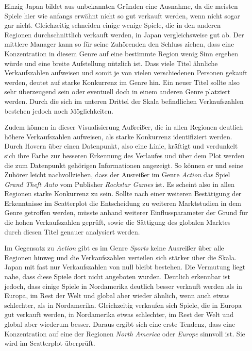 \documentclass[usegeometry=true]{scrartcl}
\begin{document}
Einzig Japan bildet aus unbekannten Gründen eine Ausnahme, da die meisten Spiele hier wie anfangs erwähnt nicht so gut verkauft werden, wenn nicht sogar gar nicht. 
Gleichzeitig schneiden einige wenige Spiele, die in den anderen Regionen durchschnittlich verkauft werden, in Japan vergleichsweise gut ab. 
Der mittlere Manager kann so für seine Zuhörenden den Schluss ziehen, dass eine Konzentration in diesem Genre auf eine bestimmte Region wenig Sinn ergeben würde und eine breite Aufstellung nützlich ist.
Dass viele Titel ähnliche Verkaufszahlen aufweisen und somit je von vielen verschiedenen Personen gekauft werden, deutet auf starke Konkurrenz im Genre hin. 
Ein neuer Titel sollte also sehr überzeugend sein oder eventuell doch in einem anderen Genre platziert werden. 
Durch die sich im unteren Drittel der Skala befindlichen Verkaufszahlen bestehen jedoch noch Möglichkeiten.

Zudem können in dieser Visualisierung Außreißer, die in allen Regionen deutlich höhere Verkaufszahlen aufweisen, als starke Konkurrenz identifiziert werden. 
Durch Hovern über einen Datenpunkt, also eine Linie, kräftigt und verdunkelt sich ihre Farbe zur besseren Erkennung des Verlaufes und über dem Plot werden die zum Datenpunkt gehörigen Informationen angezeigt.
So können er und seine Zuhörer leicht nachvollziehen, dass der Ausreißer im Genre \textit{Action} das Spiel \textit{Grand Theft Auto} vom Publisher \textit{Rockstar Games} ist.
Es scheint also in allen Regionen starke Konkurrenz zu sein. 
Sollte nach einer weiteren Bestätigung der Erkenntnisse im Scatterplot die Entscheidung zu weiteren Marktstudien in dem Genre getroffen werden, müsste anhand weiterer Einflussparameter der Grund für die hohen Verkaufszahlen geprüft, sowie die Sättigung des globalen Marktes durch diesen Titel genauer analysiert werden.

Im Gegensatz zu \textit{Action} gibt es im Genre \textit{Sports} keine Ausreißer über alle Regionen hinweg und die Verkaufszahlen verteilen sich stärker über die Skala. 
Japan mit fast nur Verkaufszahlen von null bleibt bestehen. Die Vermutung liegt nahe, dass diese Spiele dort nicht angeboten wurden.
Deutlich erkennbar ist jedoch, dass einige Spiele in Nordamerika deutlich besser verkauft werden als in Europa, im Rest der Welt und global aber wieder ähnlich, wenn auch etwas schlechter, als in Nordamerika. 
Gleichzeitig verkaufen sich Spiele, die in Europa gut verkauft werden, in Nordamerika etwas schlechter, im Rest der Welt und global aber wiederum besser. 
Daraus ergibt sich eine erste Tendenz, dass eine Konzentration auf eine der Regionen \textit{North America} oder \textit{Europe} sinnvoll ist.
Sie wird im Scatterplot überprüft.
\end{document}
